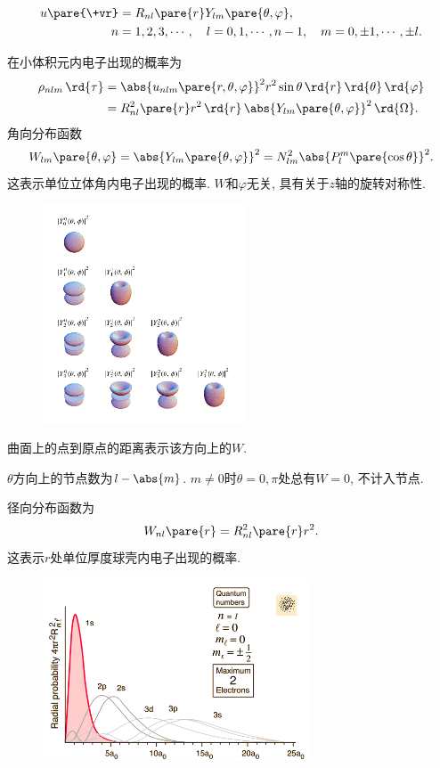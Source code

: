 \documentclass[hidelinks]{ctexart}
\begin{document}
\begin{resume}
    \vspace{-\baselineskip}
    \begin{align*}
         u\pare{\+vr} &= R_{nl}\pare{r} Y_{lm}\pare{\theta,\varphi}, \\
         n &= 1,2,3,\cdots, \quad l=0,1,\cdots,n-1,\quad m = 0,\pm1,\cdots,\pm l.
    \end{align*} 
\end{resume}
在小体积元内电子出现的概率为
\begin{align*}
    \rho_{nlm} \,\rd{\tau} &= \abs{u_{nlm}\pare{r,\theta,\varphi}}^2 r^2\sin\theta\,\rd{r}\,\rd{\theta}\,\rd{\varphi} \\
    &= R_{nl}^2\pare{r}r^2\,\rd{r} \,\abs{Y_{lm}\pare{\theta,\varphi}}^2\,\rd{\Omega}.
\end{align*}
角向分布函数
\[ W_{lm}\pare{\theta,\varphi} = \abs{Y_{lm}\pare{\theta,\varphi}}^2 = N_{lm}^2\abs{P_l^m\pare{\cos\theta}}^2. \]
这表示单位立体角内电子出现的概率. $W$和$\varphi$无关, 具有关于$z$轴的旋转对称性.
\begin{figure}[ht]
    \centering
    \includegraphics[width=6cm]{src/SphericalHarmonics.png}
\end{figure}
曲面上的点到原点的距离表示该方向上的$W$.
\begin{remark}
    $\theta$方向上的节点数为$l-\abs{m}$. $m \neq 0$时$\theta = 0,\pi$处总有$W=0$, 不计入节点.
\end{remark}
径向分布函数为
\[ W_{nl}\pare{r} = R_{nl}^2\pare{r}r^2. \]
这表示$r$处单位厚度球壳内电子出现的概率.
\begin{figure}[ht]
    \centering
    \includegraphics[width=8cm]{src/hy1s.png}
\end{figure}
\end{document}
